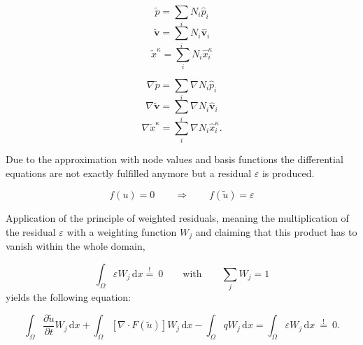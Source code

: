 \begin{minipage}[b]{0.47\textwidth}
\begin{equation}
\label{eq:p}
	\tilde p = \sum_i N_i \hat{p}_i
\end{equation}
\begin{equation}
\label{eq:v}
	\tilde{\mathbf v} = \sum_i N_i \hat{\mathbf v}_i
\end{equation}
\begin{equation}
\label{eq:x}
	\tilde x^\kappa  = \sum_i N_i \hat x_i^\kappa
\end{equation}
\end{minipage}
\hfill
\begin{minipage}[b]{0.47\textwidth}
\begin{equation}
\label{eq:dp}
	\nabla \tilde p = \sum_i \nabla N_i \hat{p}_i
\end{equation}
\begin{equation}
\label{eq:dv}
	\nabla \tilde{\mathbf v} = \sum_i \nabla N_i \hat{\mathbf v}_i
\end{equation}
\begin{equation}
\label{eq:dx}
	\nabla \tilde x^\kappa  = \sum_i \nabla N_i \hat x_i^\kappa .
\end{equation}
\end{minipage}

Due to the approximation with node values and basis functions the differential
equations are not exactly fulfilled anymore but a residual $\varepsilon$ is produced.

\begin{equation}
	f(u) = 0  \qquad \Rightarrow \qquad f(\tilde u) = \varepsilon
\end{equation}

Application of the principle of weighted residuals, meaning the multiplication
of the residual $\varepsilon$ with a weighting function $W_j$  and claiming that
this product has to vanish within the whole domain,

\begin{equation}
	\int_\Omega \varepsilon W_j \, \mathrm{d}x \overset {!}{=} \: 0 \qquad \textrm{with} \qquad \sum_j W_j =1
\end{equation}
yields the following equation:

\begin{equation}
	\int_\Omega \frac{\partial \tilde u}{\partial t} W_j \, \mathrm{d}x + \int_\Omega 
	 \left[ \nabla \cdot F(\tilde u) \right] W_j  \, \mathrm{d}x - \int_\Omega q W_j \, \mathrm{d}x = \int_\Omega \varepsilon W_j \, \mathrm{d}x \: \overset {!}{=} \: 0.	
\label{eq:weightedResidual}	
\end{equation}

